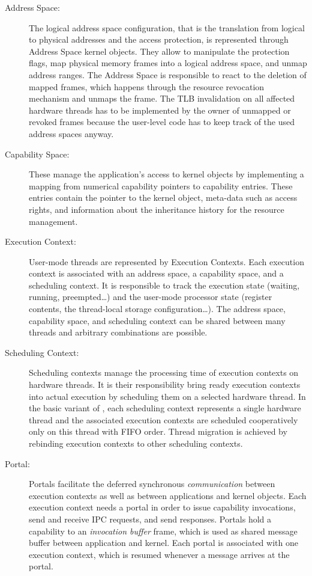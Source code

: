 \begin{description}
\item[Address Space:]
The logical address space configuration, that is the translation from logical to physical addresses and the access protection, is represented through Address Space kernel objects. They allow to manipulate the protection flags, map physical memory frames into a logical address space, and unmap address ranges. The Address Space is responsible to react to the deletion of mapped frames, which happens through the resource revocation mechanism and unmaps the frame. The TLB invalidation on all affected hardware threads has to be implemented by the owner of unmapped or revoked frames because the user-level code has to keep track of the used address spaces anyway.

\item[Capability Space:] These manage the application's access to kernel objects by implementing a mapping from numerical capability pointers to capability entries. These entries contain the pointer to the kernel object, meta-data such as access rights, and information about the inheritance history for the resource management.  

\item[Execution Context:] User-mode threads are represented by Execution Contexts. Each execution context is associated with an address space, a capability space, and a scheduling context. It is responsible to track the execution state (waiting, running, preempted\ldots) and the user-mode processor state (register contents, the thread-local storage configuration\ldots). The address space, capability space, and scheduling context can be shared between many threads and arbitrary combinations are possible.

\item[Scheduling Context:]
Scheduling contexts manage the processing time of execution contexts on hardware threads. It is their responsibility bring ready execution contexts into actual execution by scheduling them on a selected hardware thread. 
In the basic variant of \mythos, each scheduling context represents a single hardware thread and the associated execution contexts are scheduled cooperatively only on this thread with FIFO order. Thread migration is achieved by rebinding execution contexts to other scheduling contexts.

\item[Portal:] 
Portals facilitate the deferred synchronous \emph{communication} between execution contexts as well as between applications and kernel objects. Each execution context needs a portal in order to issue capability invocations, send and receive IPC requests, and send responses. Portals hold a capability to an \emph{invocation buffer} frame, which is used as shared message buffer between application and kernel. Each portal is associated with one execution context, which is resumed whenever a message arrives at the portal.


\end{description}
